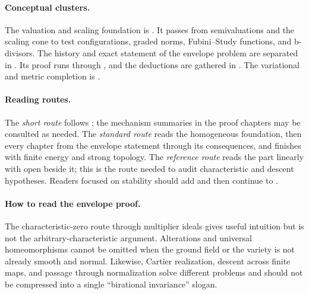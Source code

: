 \paragraph{Conceptual clusters.}
\label{front:part4-conceptual-clusters}
The valuation and scaling foundation is
.
It passes from semivaluations and the scaling cone to test configurations,
graded norms, Fubini--Study functions, and b-divisors.  The history and exact
statement of the envelope problem are separated in
.  Its proof runs
through
,
and the deductions are gathered in .
The variational and metric completion is
.

\paragraph{Reading routes.}
\label{front:part4-reading-routes}
The \emph{short route} follows
;
the mechanism summaries in the proof chapters may be consulted as needed.
The \emph{standard route} reads the homogeneous foundation, then every chapter
from the envelope statement through its consequences, and finishes with
finite energy and strong topology.  The \emph{reference route} reads the part
linearly with
open beside it; this is the route needed to audit characteristic and descent
hypotheses.  Readers focused on stability should add
 and then continue to
.

\paragraph{How to read the envelope proof.}
\label{front:part4-how-to-read-the-envelope-proof}
The characteristic-zero route through multiplier ideals gives useful
intuition but is not the arbitrary-characteristic argument.  Alterations and
universal homeomorphisms cannot be omitted when the ground field or the
variety is not already smooth and normal.  Likewise, Cartier realization,
descent across finite maps, and passage through normalization solve different
problems and should not be compressed into a single ``birational invariance''
slogan.

